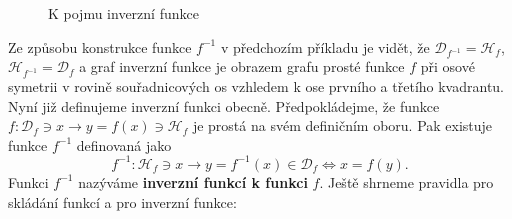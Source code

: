        \begin{figure}[ht!]
          \centering  
          \caption{K pojmu inverzní funkce}
          \label{mai:fig016}
       \end{figure}
      
        
      
      Ze způsobu konstrukce funkce \(f^{-1}\) v předchozím příkladu je vidět, že 
      \(\mathcal{D}_{f^{-1}} = \mathcal{H}_f\), \(\mathcal{H}_{f^{-1}} = \mathcal{D}_f\) a graf 
      inverzní funkce je obrazem grafu prosté funkce \(f\) při osové symetrii v rovině 
      souřadnicových os vzhledem k ose prvního a třetího kvadrantu. Nyní již definujeme inverzní 
      funkci obecně. Předpokládejme, že funkce \(f : \mathcal{D}_f\ni x \rightarrow y = f(x)\ni 
      \mathcal{H}_f\) je prostá na svém definičním oboru. Pak existuje funkce \(f^{-1}\) definovaná 
      jako
      \begin{equation}\label{mai:eq029}
        f^{-1} :\mathcal{H}_f\ni x\rightarrow y = f^{-1}(x)\in\mathcal{D}_f\Leftrightarrow x = f(y).
      \end{equation}
      Funkci \(f^{-1}\) nazýváme \textbf{inverzní funkcí k funkci} \(f\). Ještě shrneme pravidla 
      pro skládání funkcí a pro inverzní funkce:

